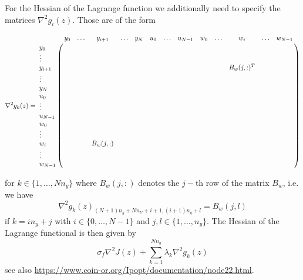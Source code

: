 \documentclass[
12pt, %
a4paper, %
onecolumn, %
portrait %
]{article}
\begin{document}
For the Hessian of the Lagrange function we additionally need to specify the matrices $\nabla^2 g_i(z)$. Those are of the form 
\def\Bw{B_w(j,:)}
\def\Bwt{\Bw^T}
\begin{scriptsize}
\begin{equation}
\nabla^2 g_k(z) = 
\bordermatrix{
              & y_0 & \hdots & y_{i+1} & \hdots & y_N & u_0 & \hdots & u_{N-1} & w_0 & \hdots & w_i & \hdots & w_{N-1} \cr
y_0           &     &        &         &        &     &     &        &         &     &        &     &        &         \cr
\vdots        &     &        &         &        &     &     &        &         &     &        &     &        &         \cr
y_{i+1}       &     &        &         &        &     &     &        &         &     &        & \Bwt&        &         \cr
\vdots        &     &        &         &        &     &     &        &         &     &        &     &        &         \cr
y_N           &     &        &         &        &     &     &        &         &     &        &     &        &         \cr
u_0           &     &        &         &        &     &     &        &         &     &        &     &        &         \cr
\vdots        &     &        &         &        &     &     &        &         &     &        &     &        &         \cr
u_{N-1}       &     &        &         &        &     &     &        &         &     &        &     &        &         \cr
w_0           &     &        &         &        &     &     &        &         &     &        &     &        &         \cr
\vdots        &     &        &         &        &     &     &        &         &     &        &     &        &         \cr
w_i           &     &        &    \Bw  &        &     &     &        &         &     &        &     &        &         \cr
\vdots        &     &        &         &        &     &     &        &         &     &        &     &        &         \cr
w_{N-1}       &     &        &         &        &     &     &        &         &     &        &     &        &         \cr
}
\end{equation}
\end{scriptsize}
for $k \in \{1, \hdots, N n_y\}$ where $\Bw$ denotes the $j-$th row of the matrix $B_w$, i.e.
we have 
\begin{equation}
\nabla^2 g_{k}(z)_{(N+1)n_y+N n_U+i+1,(i+1) n_y + l} = B_w(j,l)
\end{equation}
if $k = i n_y + j$ with $i \in \{0, \hdots, N-1\}$ and $j,l \in \{1, \hdots, n_y\}$.
The Hessian of the Lagrange functional is then given by
\begin{equation}
\sigma_f \nabla^2 J(z) + \sum_{k=1}^{N n_y} \lambda_k \nabla^2 g_k(z)
\end{equation}
see also \url{https://www.coin-or.org/Ipopt/documentation/node22.html}.
\end{document}

